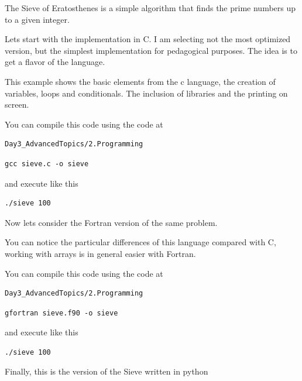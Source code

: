 The Sieve of Eratosthenes is a simple algorithm that finds the prime numbers up to a given integer.

Lets start with the implementation in C. I am selecting not the most optimized version, but the simplest implementation for pedagogical purposes. The idea is to get a flavor of the language.



This example shows the basic elements from the c language, the creation of variables, loops and conditionals. The inclusion of libraries and the printing on screen.

You can compile this code using the code at 

\begin{lstlisting}
Day3_AdvancedTopics/2.Programming
\end{lstlisting}

\begin{lstlisting}
gcc sieve.c -o sieve
\end{lstlisting}

and execute like this

\begin{lstlisting}
./sieve 100
\end{lstlisting}

Now lets consider the Fortran version of the same problem.



You can notice the particular differences of this language compared with C, working with arrays is in general easier with Fortran.

You can compile this code using the code at 

\begin{lstlisting}
Day3_AdvancedTopics/2.Programming
\end{lstlisting}

\begin{lstlisting}
gfortran sieve.f90 -o sieve
\end{lstlisting}

and execute like this

\begin{lstlisting}
./sieve 100
\end{lstlisting}

Finally, this is the version of the Sieve written in python



